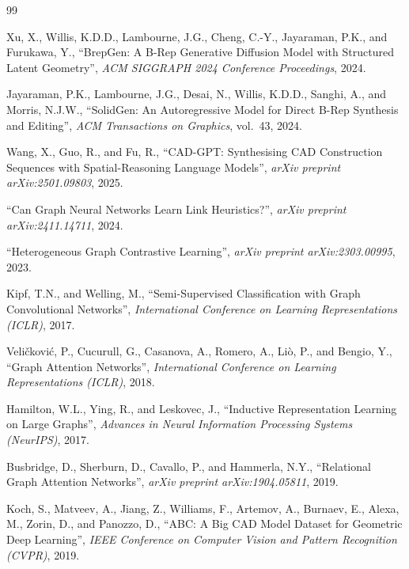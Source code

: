 \documentclass[12pt,oneside,a4paper]{report}
\begin{document}
\begin{thebibliography}{99}

 Xu, X., Willis, K.D.D., Lambourne, J.G., Cheng, C.-Y.,
Jayaraman, P.K., and Furukawa, Y., ``BrepGen: A B-Rep Generative Diffusion
Model with Structured Latent Geometry'', \textit{ACM SIGGRAPH 2024 Conference
Proceedings}, 2024.

 Jayaraman, P.K., Lambourne, J.G., Desai, N., Willis,
K.D.D., Sanghi, A., and Morris, N.J.W., ``SolidGen: An Autoregressive Model
for Direct B-Rep Synthesis and Editing'', \textit{ACM Transactions on
Graphics}, vol.~43, 2024.

 Wang, X., Guo, R., and Fu, R., ``CAD-GPT: Synthesising
CAD Construction Sequences with Spatial-Reasoning Language Models'',
\textit{arXiv preprint arXiv:2501.09803}, 2025.

 ``Can Graph Neural Networks Learn Link
Heuristics?'', \textit{arXiv preprint arXiv:2411.14711}, 2024.

 ``Heterogeneous Graph Contrastive Learning'',
\textit{arXiv preprint arXiv:2303.00995}, 2023.

 Kipf, T.N., and Welling, M., ``Semi-Supervised
Classification with Graph Convolutional Networks'', \textit{International
Conference on Learning Representations (ICLR)}, 2017.

 Veli\v{c}kovi\'{c}, P., Cucurull, G., Casanova,
A., Romero, A., Li\`{o}, P., and Bengio, Y., ``Graph Attention Networks'',
\textit{International Conference on Learning Representations (ICLR)}, 2018.

 Hamilton, W.L., Ying, R., and Leskovec, J.,
``Inductive Representation Learning on Large Graphs'', \textit{Advances in
Neural Information Processing Systems (NeurIPS)}, 2017.

 Busbridge, D., Sherburn, D., Cavallo, P., and
Hammerla, N.Y., ``Relational Graph Attention Networks'', \textit{arXiv
preprint arXiv:1904.05811}, 2019.

 Koch, S., Matveev, A., Jiang, Z., Williams, F.,
Artemov, A., Burnaev, E., Alexa, M., Zorin, D., and Panozzo, D., ``ABC: A Big
CAD Model Dataset for Geometric Deep Learning'', \textit{IEEE Conference on
Computer Vision and Pattern Recognition (CVPR)}, 2019.


\end{thebibliography}
\end{document}
